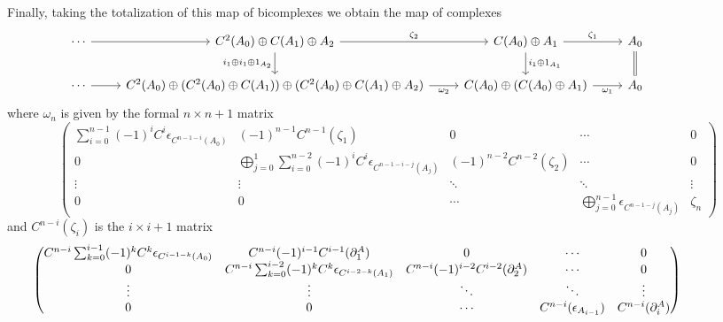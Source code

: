 Finally, taking the totalization of this map of bicomplexes we obtain the map of complexes
\[\hspace{-50pt}\begin{tikzcd}
	\cdots & {C^2(A_0)\oplus C(A_1)\oplus A_2} & {C(A_0)\oplus A_1} & {A_0} \\
	\cdots & {C^2(A_0)\oplus (C^2(A_0)\oplus C(A_1))\oplus (C^2(A_0)\oplus C(A_1)\oplus A_2)} & {C(A_0)\oplus (C(A_0)\oplus A_1)} & {A_0}
	\arrow[from=1-1, to=1-2]
	\arrow["{\zeta_2}", from=1-2, to=1-3]
	\arrow["{\zeta_1}", from=1-3, to=1-4]
	\arrow[Rightarrow, no head, from=1-4, to=2-4]
	\arrow["{i_1\oplus 1_{A_1}}", from=1-3, to=2-3]
	\arrow["{\omega_1}"', from=2-3, to=2-4]
	\arrow["{\omega_2}"', from=2-2, to=2-3]
	\arrow[from=2-1, to=2-2]
	\arrow["{i_1\oplus i_1\oplus 1_{A_2}}"', from=1-2, to=2-2]
\end{tikzcd}\]
where $\omega_n$ is given by the formal $n\times n+1$ matrix
\begin{equation*}
    \begin{pmatrix}
        \sum_{i=0}^{n-1}(-1)^iC^i\epsilon_{C^{n-1-i}(A_0)} & (-1)^{n-1}C^{n-1}(\zeta_1) & 0 & \cdots & 0 \\
        0 & \bigoplus_{j=0}^1\sum_{i=0}^{n-2}(-1)^iC^i\epsilon_{C^{n-1-i-j}(A_j)} & (-1)^{n-2}C^{n-2}(\zeta_2) & \cdots & 0 \\
        \vdots & \vdots & \ddots & \ddots & \vdots \\
        0 & 0 & \cdots & \bigoplus_{j=0}^{n-1}\epsilon_{C^{n-1-j}(A_j)} & \zeta_{n}
    \end{pmatrix}
\end{equation*}
and $C^{n-i}(\zeta_i)$ is the $i\times i+1$ matrix 
\begin{equation*}\hspace{-50pt}
    \begin{pmatrix}
        C^{n-i}\sum_{k=0}^{i-1}(-1)^kC^k\epsilon_{C^{i-1-k}(A_0)} & C^{n-i}(-1)^{i-1}C^{i-1}(\partial_1^A) & 0 & \cdots & 0 \\
        0 & C^{n-i}\sum_{k=0}^{i-2}(-1)^kC^k\epsilon_{C^{i-2-k}(A_1)} & C^{n-i}(-1)^{i-2}C^{i-2}(\partial_2^A) & \cdots & 0 \\
        \vdots & \vdots & \ddots & \ddots & \vdots \\
        0 & 0 & \cdots & C^{n-i}(\epsilon_{A_{i-1}}) & C^{n-i}(\partial_{i}^A)
    \end{pmatrix}
\end{equation*}

